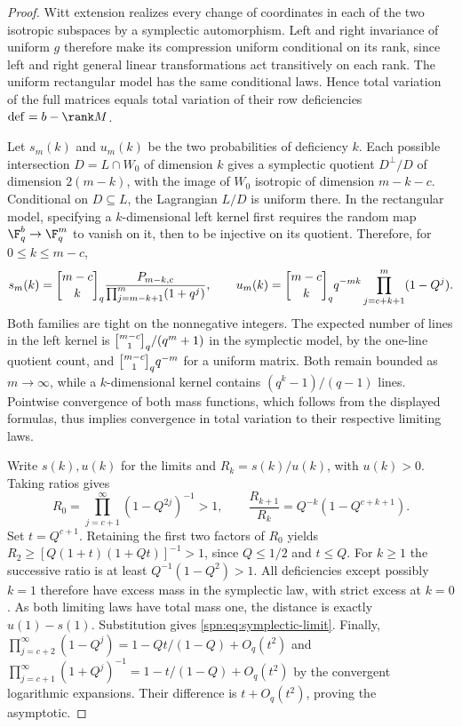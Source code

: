 \begin{proof}
Witt extension realizes every change of coordinates in each of the two
isotropic subspaces by a symplectic automorphism. Left and right invariance
of uniform $g$ therefore make its compression uniform conditional on its
rank, since left and right general linear transformations act transitively
on each rank. The uniform rectangular model has the same conditional laws.
Hence total variation of the full matrices equals total variation of their
row deficiencies $\mathrm{def}=b-\rank M$.

Let $s_m(k)$ and $u_m(k)$ be the two probabilities of deficiency $k$. Each
possible intersection $D=L\cap W_0$ of dimension $k$ gives a symplectic
quotient $D^\perp/D$ of dimension $2(m-k)$, with the image of $W_0$ isotropic
of dimension $m-k-c$. Conditional on $D\subseteq L$, the Lagrangian $L/D$ is
uniform there. In the rectangular model, specifying a $k$-dimensional left
kernel first requires the random map $\F_q^b\to\F_q^m$ to vanish on it, then
to be injective on its quotient. Therefore, for $0\le k\le m-c$,
\[
 s_m(k)=\spnqbin{m-c}{k}{q}\frac{P_{m-k,c}}{\prod_{j=m-k+1}^{m}(1+q^j)},
 \qquad
 u_m(k)=\spnqbin{m-c}{k}{q}q^{-mk}\prod_{j=c+k+1}^{m}(1-Q^j).
\]
Both families are tight on the nonnegative integers. The expected number of
lines in the left kernel is $\spnqbin{m-c}{1}{q}/(q^m+1)$ in the symplectic
model, by the one-line quotient count, and $\spnqbin{m-c}{1}{q}q^{-m}$ for a
uniform matrix. Both remain bounded as $m\to\infty$, while a $k$-dimensional
kernel contains $(q^k-1)/(q-1)$ lines. Pointwise convergence of both mass
functions, which follows from the displayed formulas, thus implies
convergence in total variation to their respective limiting laws.

Write $s(k),u(k)$ for the limits and $R_k=s(k)/u(k)$, with $u(k)>0$. Taking
ratios gives
\[
 R_0=\prod_{j=c+1}^{\infty}(1-Q^{2j})^{-1}>1,\qquad
 \frac{R_{k+1}}{R_k}=Q^{-k}(1-Q^{c+k+1}).
\]
Set $t=Q^{c+1}$. Retaining the first two factors of $R_0$ yields
$R_2\ge[Q(1+t)(1+Qt)]^{-1}>1$, since $Q\le1/2$ and $t\le Q$. For $k\ge1$ the
successive ratio is at least $Q^{-1}(1-Q^2)>1$. All deficiencies except
possibly $k=1$ therefore have excess mass in the symplectic law, with strict
excess at $k=0$. As both limiting laws have total mass one, the distance is
exactly $u(1)-s(1)$. Substitution gives \eqref{spn:eq:symplectic-limit}.
Finally, $\prod_{j=c+2}^\infty(1-Q^j)=1-Qt/(1-Q)+O_q(t^2)$ and
$\prod_{j=c+1}^\infty(1+Q^j)^{-1}=1-t/(1-Q)+O_q(t^2)$ by the convergent
logarithmic expansions. Their difference is $t+O_q(t^2)$, proving the
asymptotic.
\end{proof}

